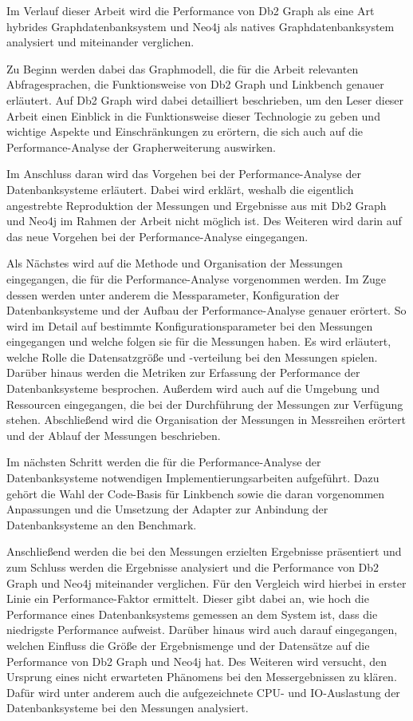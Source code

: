 Im Verlauf dieser Arbeit wird die Performance von Db2 Graph als eine Art hybrides Graphdatenbanksystem und Neo4j als natives Graphdatenbanksystem analysiert und miteinander verglichen. 

Zu Beginn werden dabei das Graphmodell, die für die Arbeit relevanten Abfragesprachen, die Funktionsweise von Db2 Graph und Linkbench genauer erläutert. Auf Db2 Graph wird dabei detailliert beschrieben, um den Leser dieser Arbeit einen Einblick in die Funktionsweise dieser Technologie zu geben und wichtige Aspekte und Einschränkungen zu erörtern, die sich auch auf die Performance-Analyse der Grapherweiterung auswirken.

Im Anschluss daran wird das Vorgehen bei der Performance-Analyse der Datenbanksysteme erläutert. Dabei wird erklärt, weshalb die eigentlich angestrebte Reproduktion der Messungen und Ergebnisse aus \cite{sigmod_tian} mit Db2 Graph und Neo4j im Rahmen der Arbeit nicht möglich ist. Des Weiteren wird darin auf das neue Vorgehen bei der Performance-Analyse eingegangen. 

Als Nächstes wird auf die Methode und Organisation der Messungen eingegangen, die für die Performance-Analyse vorgenommen werden. Im Zuge dessen werden unter anderem die Messparameter, Konfiguration der Datenbanksysteme und der Aufbau der Performance-Analyse genauer erörtert. So wird im Detail auf bestimmte Konfigurationsparameter bei den Messungen eingegangen und welche folgen sie für die Messungen haben. Es wird erläutert, welche Rolle die Datensatzgröße und -verteilung bei den Messungen spielen. Darüber hinaus werden die Metriken zur Erfassung der Performance der Datenbanksysteme besprochen. Außerdem wird auch auf die Umgebung und Ressourcen eingegangen, die bei der Durchführung der Messungen zur Verfügung stehen. Abschließend wird die Organisation der Messungen in Messreihen erörtert und der Ablauf der Messungen beschrieben.  

Im nächsten Schritt werden die für die Performance-Analyse der Datenbanksysteme notwendigen Implementierungsarbeiten aufgeführt. Dazu gehört die Wahl der Code-Basis für Linkbench sowie die daran vorgenommen Anpassungen und die Umsetzung der Adapter zur Anbindung der Datenbanksysteme an den Benchmark. 

Anschließend werden die bei den Messungen erzielten Ergebnisse präsentiert und zum Schluss werden die Ergebnisse analysiert und die Performance von Db2 Graph und Neo4j miteinander verglichen. Für den Vergleich wird hierbei in erster Linie ein Performance-Faktor ermittelt. Dieser gibt dabei an, wie hoch die Performance eines Datenbanksystems gemessen an dem System ist, dass die niedrigste Performance aufweist. Darüber hinaus wird auch darauf eingegangen, welchen Einfluss die Größe der Ergebnismenge und der Datensätze auf die Performance von Db2 Graph und Neo4j hat. Des Weiteren wird versucht, den Ursprung eines nicht erwarteten Phänomens bei den Messergebnissen zu klären. Dafür wird unter anderem auch die aufgezeichnete CPU- und IO-Auslastung der Datenbanksysteme bei den Messungen analysiert.
